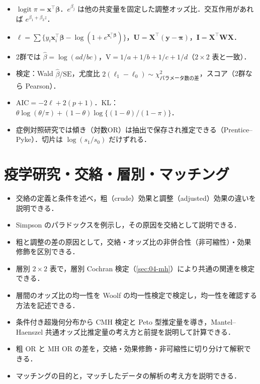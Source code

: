 \documentclass[a4paper,11pt,openany]{ltjsbook}
\newcommand{\V}{\mathrm{V}}
\newcommand{\SE}{\mathrm{SE}}
\newcommand{\logit}{\operatorname{logit}}
\newcommand{\transp}{^{\top}}
\begin{document}
\begin{summarybox}
\begin{itemize}
\item $\logit\pi=\bm x\transp\bm\beta$．$e^{\beta_j}$ は他の共変量を固定した調整オッズ比．交互作用があれば $e^{\beta_1+\beta_3z}$．
\item $\ell=\sum\{y_i\bm x_i\transp\bm\beta-\log(1+e^{\bm x_i\transp\bm\beta})\}$，$\bm U=\bm X\transp(\bm y-\bm\pi)$，$\bm I=\bm X\transp\bm W\bm X$．
\item 2群では $\hat\beta=\log(ad/bc)$，$\V=1/a+1/b+1/c+1/d$（$2\times2$ 表と一致）．
\item 検定：Wald $\hat\beta/\SE$，尤度比 $2(\ell_1-\ell_0)\sim\chi^2_{\text{パラメータ数の差}}$，スコア（2群なら Pearson）．
\item $\mathrm{AIC}=-2\ell+2(p+1)$．KL：$\theta\log(\theta/\pi)+(1-\theta)\log\{(1-\theta)/(1-\pi)\}$．
\item 症例対照研究では傾き（対数OR）は抽出で保存され推定できる（Prentice--Pyke）．切片は $\log(s_1/s_0)$ だけずれる．
\end{itemize}
\end{summarybox}

\chapter{疫学研究・交絡・層別・マッチング}\label{ch:07}

\begin{goalbox}
\begin{itemize}
\item 交絡の定義と条件を述べ，粗（crude）効果と調整（adjusted）効果の違いを説明できる．
\item Simpson のパラドックスを例示し，その原因を交絡として説明できる．
\item 粗と調整の差の原因として，交絡・オッズ比の非併合性（非可縮性）・効果修飾を区別できる．
\item 層別 $2\times2$ 表で，層別 Cochran 検定（\cref{sec:04-mh}）により共通の関連を検定できる．
\item 層間のオッズ比の均一性を Woolf の均一性検定で検定し，均一性を確認する方法を記述できる．
\item 条件付き超幾何分布から CMH 検定と Peto 型推定量を導き，Mantel--Haenszel 共通オッズ比推定量の考え方と前提を説明して計算できる．
\item 粗 OR と MH OR の差を，交絡・効果修飾・非可縮性に切り分けて解釈できる．
\item マッチングの目的と，マッチしたデータの解析の考え方を説明できる．
\end{itemize}
\end{goalbox}
\end{document}
